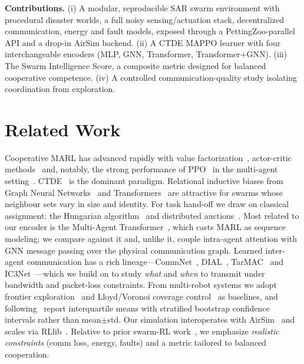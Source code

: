 \documentclass[twocolumn,10pt]{article}
\begin{document}
\noindent\textbf{Contributions.}
(i) A modular, reproducible SAR swarm environment with procedural disaster worlds,
a full noisy sensing/actuation stack, decentralized communication, energy and
fault models, exposed through a PettingZoo-parallel API and a drop-in AirSim
backend. (ii) A CTDE MAPPO learner with four interchangeable encoders
(MLP, GNN, Transformer, Transformer+GNN). (iii) The Swarm Intelligence Score, a
composite metric designed for balanced cooperative competence. (iv) A controlled
communication-quality study isolating coordination from exploration.

\section{Related Work}
Cooperative MARL has advanced rapidly with value factorization~\cite{rashid2018qmix},
actor-critic methods~\cite{lowe2017maddpg,foerster2018coma} and, notably, the
strong performance of PPO~\cite{schulman2017ppo} in the multi-agent
setting~\cite{yu2022mappo}. CTDE~\cite{oliehoek2016decpomdp} is the dominant
paradigm. Relational inductive biases from Graph Neural
Networks~\cite{velickovic2018gat,hamilton2017graphsage} and
Transformers~\cite{vaswani2017attention} are attractive for swarms whose neighbour
sets vary in size and identity. For task hand-off we draw on classical assignment:
the Hungarian algorithm~\cite{kuhn1955hungarian} and distributed
auctions~\cite{bertsekas1988auction}. Most related to our encoder is the Multi-Agent Transformer~\cite{wen2022mat}, which casts MARL as sequence modeling; we compare against it and, unlike it, couple intra-agent attention with GNN message passing over the physical communication graph. Learned inter-agent communication has a rich lineage---CommNet~\cite{sukhbaatar2016commnet}, DIAL~\cite{foerster2016dial}, TarMAC~\cite{das2019tarmac} and IC3Net~\cite{singh2019ic3net}---which we build on to study \emph{what} and \emph{when} to transmit under bandwidth and packet-loss constraints. From multi-robot systems we adopt frontier exploration~\cite{yamauchi1997frontier} and Lloyd/Voronoi coverage control~\cite{cortes2004coverage} as baselines, and following~\cite{agarwal2021rliable} report interquartile means with stratified bootstrap confidence intervals rather than mean$\pm$std. Our simulation interoperates with
AirSim~\cite{shah2018airsim} and scales via RLlib~\cite{liang2018rllib}. Relative
to prior swarm-RL work~\cite{macua2020swarm}, we emphasize \emph{realistic
constraints} (comm loss, energy, faults) and a metric tailored to balanced
cooperation.
\end{document}
